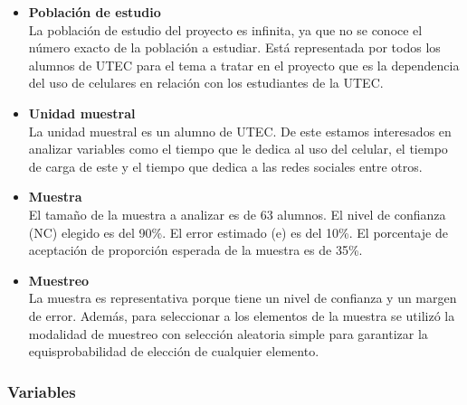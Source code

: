 \documentclass[
]{article}
\begin{document}
\begin{itemize}
\item
  \textbf{Población de estudio}\\
  La población de estudio del proyecto es infinita, ya que no se conoce
  el número exacto de la población a estudiar. Está representada por
  todos los alumnos de UTEC para el tema a tratar en el proyecto que es
  la dependencia del uso de celulares en relación con los estudiantes de
  la UTEC.
\item
  \textbf{Unidad muestral}\\
  La unidad muestral es un alumno de UTEC. De este estamos interesados
  en analizar variables como el tiempo que le dedica al uso del celular,
  el tiempo de carga de este y el tiempo que dedica a las redes sociales
  entre otros.
\item
  \textbf{Muestra}\\
  El tamaño de la muestra a analizar es de 63 alumnos. El nivel de
  confianza (NC) elegido es del 90\%. El error estimado (e) es del 10\%.
  El porcentaje de aceptación de proporción esperada de la muestra es de
  35\%.
\item
  \textbf{Muestreo}\\
  La muestra es representativa porque tiene un nivel de confianza y un
  margen de error. Además, para seleccionar a los elementos de la
  muestra se utilizó la modalidad de muestreo con selección aleatoria
  simple para garantizar la equisprobabilidad de elección de cualquier
  elemento.
\end{itemize}

\hypertarget{variables}{%
\subsubsection{\texorpdfstring{\textbf{Variables}}{Variables}}\label{variables}}
\end{document}
